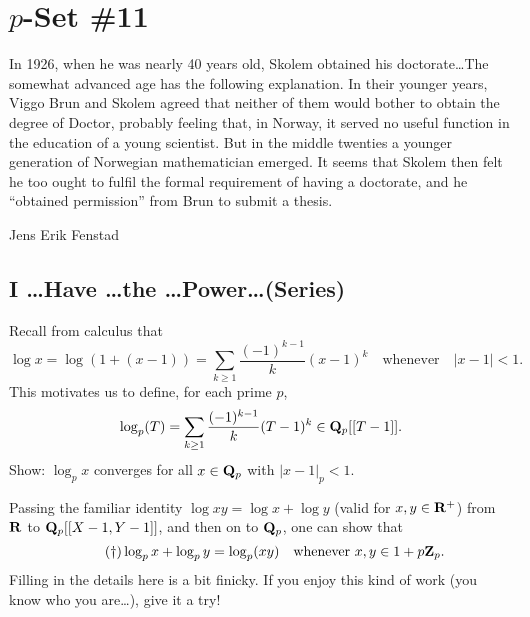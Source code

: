 \setcounter{chapter}{11}
\chapter*{$p$-Set \#11}
\label{chap:skolem}

\vspace{-0.4in}
\epigraph{In 1926, when he was nearly 40 years old, Skolem obtained his
doctorate\dots The somewhat advanced age
has the following explanation. In their younger years, Viggo Brun and
Skolem agreed that neither of them would bother to obtain the degree of
Doctor, probably feeling that, in Norway, it served no useful function
in the education of a young scientist. But in the middle twenties a
younger generation of Norwegian mathematician emerged. It seems
that Skolem then felt he too ought to fulfil the formal requirement
of having a doctorate, and he ``obtained permission'' from Brun to
submit a thesis.}{Jens Erik Fenstad}

\vspace{0.12in}
\section*{I \dots Have \dots the \dots Power\dots (Series)}
\begin{prob}\label{prob:padiclumber1} Recall from calculus that \[ \log{x} = \log(1+(x-1)) = \sum_{k\ge 1} \frac{(-1)^{k-1}}{k} (x-1)^k \quad\text{whenever} \quad |x-1| < 1.\] This motivates us to define, for each prime $p$,
\[ \log_p(T) = \sum_{k\ge 1} \frac{(-1)^{k-1}}{k} (T-1)^{k} \in \mathbf{Q}_p[[T-1]]. \] Show: $\log_p{x}$ converges for all $x \in \mathbf{Q}_p$ with $|x-1|_p < 1$.
\end{prob}

\testrule
Passing the familiar identity $\log{xy} = \log{x} +\log{y}$ (valid for $x,y \in \mathbf{R}^{+}$) from $\mathbf{R}$ to $\mathbf{Q}_p[[X-1,Y-1]]$, and then on to $\mathbf{Q}_p$, one can show that
\begin{equation}\tag{$\dagger$} \log_p{x} + \log_p{y} = \log_p(xy) \quad\text{whenever $x,y \in 1 +p\mathbf{Z}_p$}.\end{equation}
Filling in the details here is a bit finicky. If you enjoy this kind of work (you know who you are\dots), give it a try!
\testruletwo

